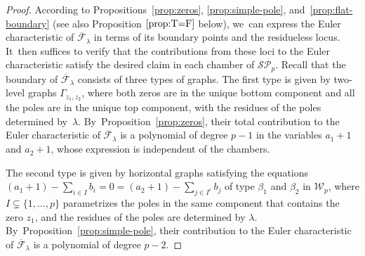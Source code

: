 \documentclass[JEP,XML,SOM,Unicode,NoFloatCountersInSection,published]{cedram}
\theoremstyle{definition}
\begin{document}
\begin{proof}
According to Propositions~\ref{prop:zeros}, \ref{prop:simple-pole}, and~\ref{prop:flat-boundary} (see also Proposition $\ref{prop:T=F}$ below), we~can express the Euler characteristic of $\overline{\mathcal F}_\lambda$ in terms of its boundary points and the residueless locus. It~then suffices to verify that the contributions from these loci to the Euler characteristic satisfy the desired claim in each chamber of $\mathcal{SP}_p$.
Recall that the boundary of $\overline{\mathcal{F}}_\lambda$ consists of three types of graphs. The first type is given by two-level graphs $\Gamma_{z_1,z_2}$, where both zeros are in the unique bottom component and all the poles are in the unique top component, with the residues of the poles determined by~$\lambda$. By~Proposition~\ref{prop:zeros}, their total contribution to the Euler characteristic of $\overline{\mathcal F}_\lambda$ is a polynomial of degree $p-1$ in the variables $a_1+1$ and $a_2+1$, whose expression is independent of the chambers.

The second type is given by horizontal graphs satisfying the equations $(a_1+1)-\sum_{i\in I}b_i=0=(a_2+1)-\sum_{j\in I^c}b_j$ of type $\beta_1$ and $\beta_2$
in $\mathcal{W}_p$, where $I\subsetneq \{1,\ldots,p\}$ parametrizes the poles in the same component that contains the zero $z_1$, and the residues of the poles are determined by $\lambda$. By~Proposition~\ref{prop:simple-pole}, their contribution to the Euler characteristic of $\overline{\mathcal F}_\lambda$ is a polynomial of degree $p-2$.


\end{proof}
\end{document}
